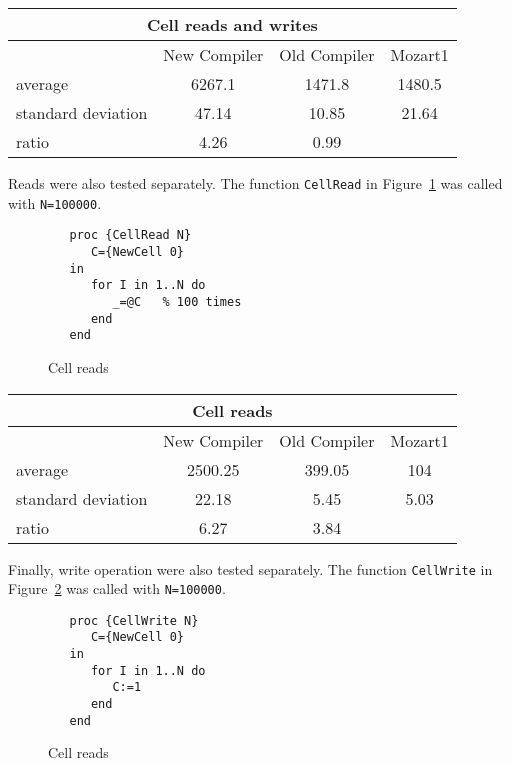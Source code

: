\documentclass[a4paper]{memoir}
\begin{document}
\begin{appendices}
\begin{center}
\begin{tabular} {| l c c c|}
\hline
\multicolumn{4}{|c|}{\textbf{Cell reads and writes}} \\ \hline
  & New Compiler& Old Compiler & Mozart1 \\
average&6267.1&1471.8&1480.5 \\
standard deviation&47.14&10.85&21.64 \\
ratio&4.26& 0.99  & \\
\hline
\end{tabular}
\end{center}



Reads were also tested separately. The function \lstinline!CellRead! in Figure~\ref{fig:perfs:cellread} was called
with \lstinline!N=100000!.

\begin{figure}[h]
\begin{lstlisting}
   proc {CellRead N}
      C={NewCell 0}
   in
      for I in 1..N do
         _=@C   % 100 times
      end
   end
\end{lstlisting}
\caption{Cell reads}
\label{fig:perfs:cellread}
\end{figure}


\begin{center}
\begin{tabular} {| l c c c|}
\hline
\multicolumn{4}{|c|}{\textbf{Cell reads}} \\ \hline
  & New Compiler& Old Compiler & Mozart1 \\
average&2500.25&399.05& 104 \\
standard deviation&22.18&5.45& 5.03 \\
ratio&6.27& 3.84  & \\

\hline
\end{tabular}
\end{center}



Finally, write operation were also tested separately. The function
\lstinline!CellWrite! in Figure~\ref{fig:perfs:cellreads} was called with \lstinline!N=100000!.

\begin{figure}[h]
\begin{lstlisting}
   proc {CellWrite N}
      C={NewCell 0}
   in
      for I in 1..N do
         C:=1
      end
   end
\end{lstlisting}
\caption{Cell reads}
\label{fig:perfs:cellreads}
\end{figure}



\end{appendices}
\end{document}
